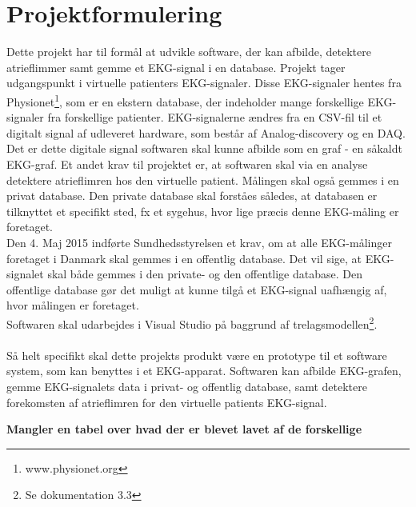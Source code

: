 \chapter{Projektformulering}

Dette projekt har til formål at udvikle software, der kan afbilde, detektere atrieflimmer samt gemme et EKG-signal i en database. Projekt tager udgangspunkt i virtuelle patienters EKG-signaler. Disse EKG-signaler hentes fra Physionet\footnote{www.physionet.org}, som er en ekstern database, der indeholder mange forskellige EKG-signaler fra forskellige patienter. EKG-signalerne  ændres fra en CSV-fil til et digitalt signal af udleveret hardware, som består af Analog-discovery og en DAQ. \\
Det er dette digitale signal softwaren skal kunne afbilde som en graf - en såkaldt EKG-graf. Et andet krav til projektet er, at softwaren skal via en analyse detektere atrieflimren hos den virtuelle patient. Målingen skal også gemmes i en privat database. Den private database skal forståes således, at databasen er tilknyttet et specifikt sted, fx et sygehus, hvor lige præcis denne EKG-måling er foretaget. \\
Den 4. Maj 2015 indførte Sundhedsstyrelsen et krav, om at alle EKG-målinger foretaget i Danmark skal gemmes i en offentlig database. Det vil sige, at EKG-signalet skal både gemmes i den private- og den offentlige database. Den offentlige database gør det muligt at kunne tilgå et EKG-signal uafhængig af, hvor målingen er foretaget.\\
Softwaren skal udarbejdes i Visual Studio på baggrund af trelagsmodellen\footnote{Se dokumentation 3.3}.\\ \\
Så helt specifikt skal dette projekts produkt være en prototype til et software system, som kan benyttes i et EKG-apparat. Softwaren kan afbilde EKG-grafen, gemme EKG-signalets data i privat- og offentlig database, samt detektere forekomsten af atrieflimren for den virtuelle patients EKG-signal.  

\textbf{Mangler en tabel over hvad der er blevet lavet af de forskellige}
